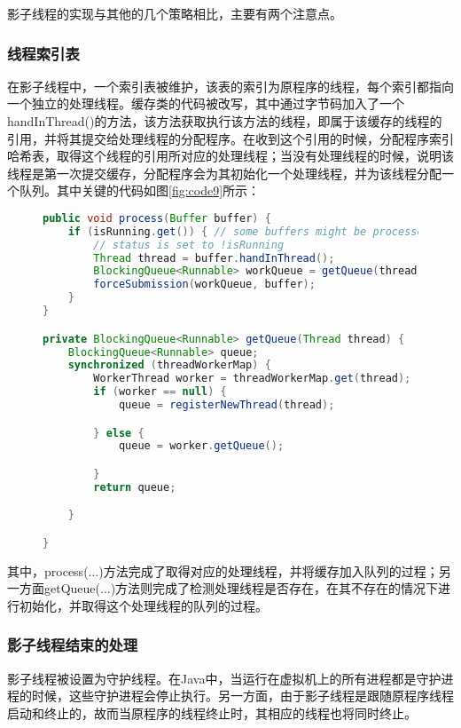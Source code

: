 影子线程的实现与其他的几个策略相比，主要有两个注意点。

\subsubsection{线程索引表}

在影子线程中，一个索引表被维护，该表的索引为原程序的线程，每个索引都指向一个独立的处理线程。缓存类的代码被改写，其中通过字节码加入了一个handInThread()的方法，该方法获取执行该方法的线程，即属于该缓存的线程的引用，并将其提交给处理线程的分配程序。在收到这个引用的时候，分配程序索引哈希表，取得这个线程的引用所对应的处理线程；当没有处理线程的时候，说明该线程是第一次提交缓存，分配程序会为其初始化一个处理线程，并为该线程分配一个队列。其中关键的代码如图\ref{fig:code9}所示：

\begin{figure}[!htp]
\begin{lstlisting}[language=Java]
public void process(Buffer buffer) {
	if (isRunning.get()) { // some buffers might be processed after the
		// status is set to !isRunning
		Thread thread = buffer.handInThread();
		BlockingQueue<Runnable> workQueue = getQueue(thread);
		forceSubmission(workQueue, buffer);
	}
}

private BlockingQueue<Runnable> getQueue(Thread thread) {
	BlockingQueue<Runnable> queue;
	synchronized (threadWorkerMap) {
		WorkerThread worker = threadWorkerMap.get(thread);
		if (worker == null) {
			queue = registerNewThread(thread);

		} else {
			queue = worker.getQueue();

		}
		return queue;

	}

}
\end{lstlisting}
\end{figure}

其中，process(...)方法完成了取得对应的处理线程，并将缓存加入队列的过程；另一方面getQueue(...)方法则完成了检测处理线程是否存在，在其不存在的情况下进行初始化，并取得这个处理线程的队列的过程。

\subsubsection{影子线程结束的处理}

影子线程被设置为守护线程。在Java中，当运行在虚拟机上的所有进程都是守护进程的时候，这些守护进程会停止执行。另一方面，由于影子线程是跟随原程序线程启动和终止的，故而当原程序的线程终止时，其相应的线程也将同时终止。

